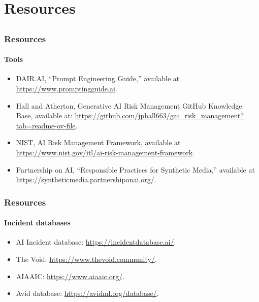 \documentclass[11pt,
               aspectratio=169,
               hyperref={colorlinks}
               ]{beamer}
\begin{document}
 	\section{Resources} 
		\subsection*{} %

		\begin{frame}
			
			\frametitle{Resources}
			\framesubtitle{Tools}
			
			\begin{itemize}\small
				\item DAIR.AI, “Prompt Engineering Guide,” available at \url{https://www.promptingguide.ai}.
				\item Hall and Atherton, Generative AI Risk Management GitHub Knowledge Base, available at: \url{
				https://github.com/jphall663/gai_risk_management?tab=readme-ov-file}. 
				\item NIST, AI Risk Management Framework, available at \url{https://www.nist.gov/itl/ai-risk-management-framework}.
				\item Partnership on AI, “Responsible Practices for Synthetic Media,” available at \url{https://syntheticmedia.partnershiponai.org/}. 
			\end{itemize}	
			
		\end{frame}	

		\begin{frame}
			
			\frametitle{Resources}
			\framesubtitle{Incident databases}
			
			\begin{itemize}
				\item AI Incident database: \url{https://incidentdatabase.ai/}.
				\item The Void: \url{https://www.thevoid.community/}.
				\item AIAAIC: \url{https://www.aiaaic.org/}.
				\item Avid database: \url{https://avidml.org/database/}.
			\end{itemize}	
			
		\end{frame}
\end{document}
